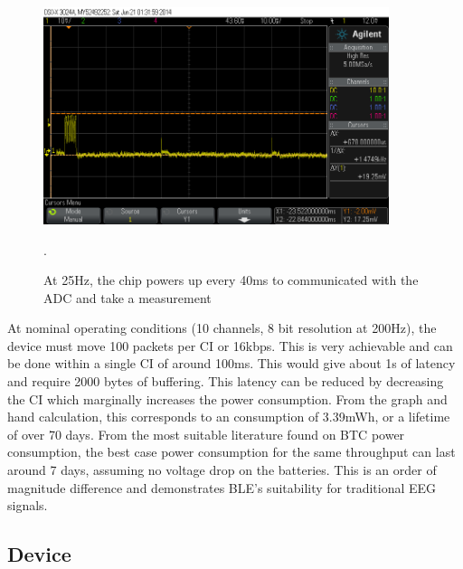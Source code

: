 \documentclass[]{article}
\begin{document}
\begin{figure}[H]
	\begin{center}
		\includegraphics[width = 0.9\textwidth]{adcpower}
	\end{center}
	\caption{At 25Hz, the chip powers up every 40ms to communicated with the \ac{ADC} and take a measurement}. 
	\label{fig:adcpower}
\end{figure}





At nominal operating conditions (10 channels, 8 bit resolution at 200Hz), the device must move 100 packets per \ac{CI} or 16kbps. This is very achievable and can be done within a single \ac{CI} of around 100ms. This would give about 1s of latency and require 2000 bytes of buffering. This latency can be reduced by decreasing the \ac{CI} which marginally increases the power consumption. From the graph and hand calculation, this corresponds to an consumption of 3.39mWh, or a lifetime of over 70 days. From the most suitable literature found \cite{rahuli} on \ac{BTC} power consumption, the best case power consumption for the same throughput can last around 7 days, assuming no voltage drop on the batteries. This is an order of magnitude difference and demonstrates \ac{BLE}'s suitability for traditional \ac{EEG} signals. 












\subsection{Device}
\end{document}
